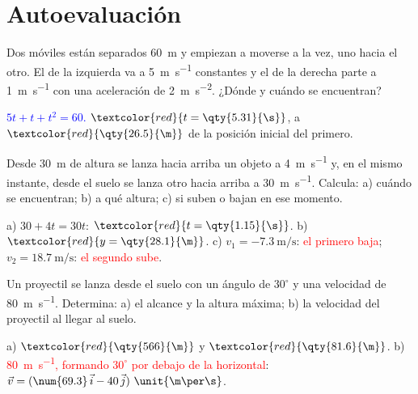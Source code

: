 \section{Autoevaluación}\label{sec:ud9-autoevaluacion}

\begin{exercise}
    Dos móviles están separados \qty{60}{\m} y empiezan a moverse a la vez, uno hacia el otro. El de la izquierda va a
    \qty{5}{\m\per\s} constantes y el de la derecha parte a \qty{1}{\m\per\s} con una aceleración de \qty{2}{\m\per\s\squared}.
    ¿Dónde y cuándo se encuentran?
    \begin{solu}
        \textcolor{blue}{\(5t + t + t^2 = 60\).} \(\textcolor{red}{t = \qty{5.31}{\s}}\), a \(\textcolor{red}{\qty{26.5}{\m}}\) de la posición
        inicial del primero.
    \end{solu}
\end{exercise}

\begin{exercise}
    Desde \qty{30}{\m} de altura se lanza hacia arriba un objeto a \qty{4}{\m\per\s} y, en el mismo instante, desde el suelo se lanza
    otro hacia arriba a \qty{30}{\m\per\s}. Calcula: a) cuándo se encuentran; b) a qué altura; c) si suben o bajan en ese momento.
    \begin{solu}
        a) \(30 + 4t = 30t\): \(\textcolor{red}{t = \qty{1.15}{\s}}\). b) \(\textcolor{red}{y = \qty{28.1}{\m}}\).
        c) \(v_1 = \qty{-7.3}{\m\per\s}\): \textcolor{red}{el primero baja}; \(v_2 = \qty{18.7}{\m\per\s}\): \textcolor{red}{el segundo sube}.
    \end{solu}
\end{exercise}

\begin{exercise}
    Un proyectil se lanza desde el suelo con un ángulo de \(30^\circ\) y una velocidad de \qty{80}{\m\per\s}. Determina: a) el alcance
    y la altura máxima; b) la velocidad del proyectil al llegar al suelo.
    \begin{solu}
        a) \(\textcolor{red}{\qty{566}{\m}}\) y \(\textcolor{red}{\qty{81.6}{\m}}\). b) \textcolor{red}{\qty{80}{\m\per\s}, formando \(30^\circ\)
        por debajo de la horizontal}: \(\vec v = (\num{69.3}\,\ivec - 40\,\jvec)~\unit{\m\per\s}\).
    \end{solu}
\end{exercise}

